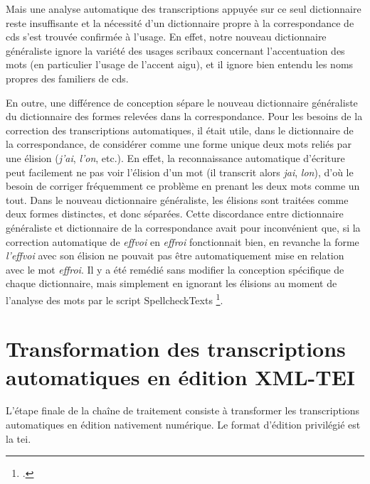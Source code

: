 \documentclass[a4paper,12pt,twoside]{book}
\begin{document}
				Mais une analyse automatique des transcriptions appuyée sur ce seul dictionnaire reste insuffisante et la nécessité d'un dictionnaire propre à la correspondance de \gls{cds} s'est trouvée confirmée à l'usage. En effet, notre nouveau dictionnaire généraliste ignore la variété des usages scribaux concernant l'accentuation des mots (en particulier l'usage de l'accent aigu), et il ignore bien entendu les noms propres des familiers de \gls{cds}. 
				
				En outre, une différence de conception sépare le nouveau dictionnaire généraliste du dictionnaire des formes relevées dans la correspondance. Pour les besoins de la correction des transcriptions automatiques, il était utile, dans le dictionnaire de la correspondance, de considérer comme une forme unique deux mots reliés par une élision (\textit{j'ai}, \textit{l'on}, etc.). En effet, la reconnaissance automatique d'écriture peut facilement ne pas voir l'élision d'un mot (il transcrit alors \textit{jai}, \textit{lon}), d'où le besoin de corriger fréquemment ce problème en prenant les deux mots comme un tout. Dans le nouveau dictionnaire généraliste, les élisions sont traitées comme deux formes distinctes, et donc séparées. Cette discordance entre dictionnaire généraliste et dictionnaire de la correspondance avait pour inconvénient que, si la correction automatique de \textit{effvoi} en \textit{effroi} fonctionnait bien, en revanche la forme \textit{l'effvoi} avec son élision ne pouvait pas être automatiquement mise en relation avec le mot \textit{effroi}. Il y a été remédié sans modifier la conception spécifique de chaque dictionnaire, mais simplement en ignorant les élisions au moment de l'analyse des mots par le script SpellcheckTexts
				\footcite{biaySpellcheckTextsPy2022}.
				
			
	\chapter[Transformation TEI]{Transformation des transcriptions automatiques en édition XML-TEI}
	
		L'étape finale de la chaîne de traitement consiste à transformer les transcriptions automatiques en édition nativement numérique. Le format d'édition privilégié est la \gls{tei}. 
		
\end{document}
